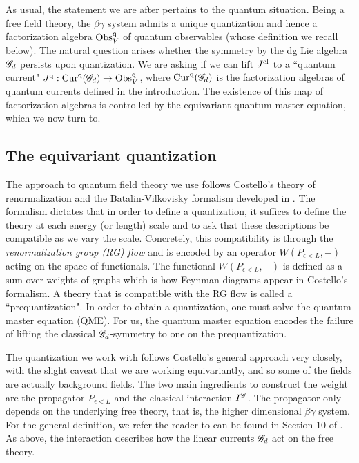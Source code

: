 As usual, the statement we are after pertains to the quantum situation. 
Being a free field theory, the $\beta\gamma$ system admits a unique quantization and hence a factorization algebra ${\rm Obs}^{{\rm q}}_V$ of quantum observables (whose definition we recall below). 
The natural question arises whether the symmetry by the dg Lie algebra $\mathscr G_d$ persists upon quantization. 
We are asking if we can lift $J^{{\rm cl}}$ to a ``quantum current" $J^{{\rm q}} : {\rm Cur}^{\rm q}(\mathscr G_d) \to {\rm Obs}^{\rm q}_V$, where ${\rm Cur}^{\rm q}(\mathscr G_d)$ is the factorization algebras of quantum currents defined in the introduction. 
The existence of this map of factorization algebras is controlled by the equivariant quantum master equation, which we now turn to.

\subsection{The equivariant quantization}

The approach to quantum field theory we use follows Costello's theory of renormalization and the Batalin-Vilkovisky formalism developed in \cite{CosRenorm}.
The formalism dictates that in order to define a quantization, it suffices to define the theory at each energy (or length) scale and to ask that these descriptions be compatible as we vary the scale.
Concretely, this compatibility is through the {\em renormalization group (RG) flow} and is encoded by an operator $W(P_{\epsilon < L}, -)$ acting on the space of functionals. 
The functional $W(P_{\epsilon < L},-)$ is defined as a sum over weights of graphs which is how Feynman diagrams appear in Costello's formalism.
A theory that is compatible with the RG flow is called a ``prequantization". 
In order to obtain a quantization, one must solve the quantum master equation (QME). 
For us, the quantum master equation encodes the failure of lifting the classical $\mathscr G_d$-symmetry to one on the prequantization.

The quantization we work with follows Costello's general approach very closely, with the slight caveat that we are working equivariantly, and so some of the fields are actually background fields. 
The two main ingredients to construct the weight are the propagator $P_{\epsilon < L}$ and the classical interaction $I^{\mathscr G}$. 
The propagator only depends on the underlying free theory, that is, the higher dimensional $\beta\gamma$ system. 
For the general definition, we refer the reader to can be found in Section 10 of \cite{CG2}.
As above, the interaction describes how the linear currents $\mathscr G_d$ act on the free theory. 

